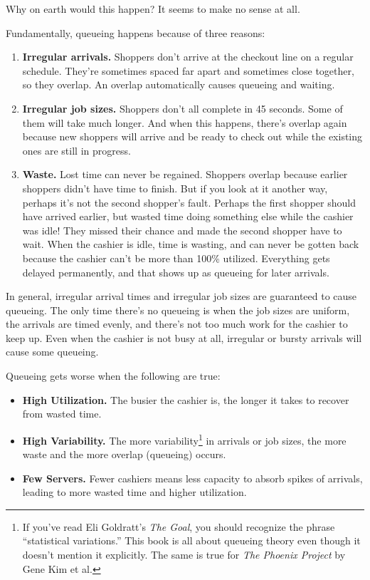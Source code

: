 \documentclass{vivid_layout}
\begin{document}
Why on earth would this happen? It seems to make no sense at all.

Fundamentally, queueing happens because of three reasons:
\begin{enumerate}	%
\item {\bfseries Irregular arrivals.} Shoppers don't arrive at the checkout line on a regular schedule. They're sometimes spaced far apart and sometimes
close together, so they overlap. An overlap automatically causes
queueing and waiting.
\item {\bfseries Irregular job sizes.} Shoppers don't all complete in 45 seconds.
Some of them will take much longer. And when this happens, there's
overlap again because new shoppers will arrive and be ready to
check out while the existing ones are still in progress.
\item {\bfseries Waste.} Lost time can never be regained. Shoppers overlap because earlier shoppers didn't have time to finish. But if you look at it another way, perhaps it's not the second shopper's fault. Perhaps the first shopper should have arrived earlier, but wasted time doing something else while the cashier was idle! They missed their chance and made the second shopper have to wait. When the cashier is idle, time is wasting, and can never be gotten back because the cashier can't be more than 100\% utilized. Everything gets delayed permanently, and that shows up as queueing for later arrivals.
\end{enumerate}
In general, irregular arrival times and irregular job sizes are guaranteed to cause queueing.  The only time there's no queueing is when the job sizes are uniform, the arrivals are timed evenly, and there's not too much work for the cashier to keep up. Even when the cashier is not busy at all, irregular or bursty arrivals will cause some queueing.

Queueing gets worse when the following are true:

\begin{itemize}
\item {\bfseries High Utilization.} The busier the cashier is, the longer it takes to recover from wasted time.
\item {\bfseries High Variability.} The more variability\footnote{If you've read Eli Goldratt's {\itshape The Goal}, you should recognize the phrase ``statistical variations.'' This book is all about queueing theory even though it doesn't mention it explicitly. The same is true for {\itshape The Phoenix Project} by Gene Kim et al.} in arrivals or job sizes, the more waste and the more overlap (queueing) occurs.
\item {\bfseries Few Servers.} Fewer cashiers means less capacity to absorb spikes of arrivals, leading to more wasted time and higher utilization.
\end{itemize}
\end{document}
